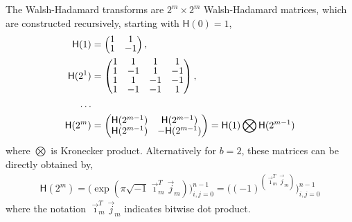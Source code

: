 \documentclass{iitthesis}          %
\newcommand{\mH}{\mathsf{H}}
\begin{document}
The Walsh-Hadamard transforms are $2^m \times 2^m$ Walsh-Hadamard matrices, which are constructed recursively, starting with $\mH(0) = 1$,
\begin{align}
\nonumber
\arraycolsep=1.4pt\def\arraystretch{0.9}
\mH(1) &=
\begin{pmatrix}
1 & 1 \\ 1 & -1
\end{pmatrix}, \\
\nonumber
\mH(2^1) &= 
\begin{pmatrix}
1 & 1 & 1 & 1 \\ 
1 & -1 & 1 & -1 \\
1 & 1 & -1 & -1 \\ 
1 & -1 & -1 & 1 \\
\end{pmatrix}, \\
\nonumber
\hdots
\\
\label{eqn:hadamard_matrix}
\mH(2^m) &= 
\begin{pmatrix}
\mH(2^{m-1}) & \mH(2^{m-1}) \\ \mH(2^{m-1}) & -\mH(2^{m-1})
\end{pmatrix} = \mH(1) \bigotimes \mH(2^{m-1})
\end{align}
where $\bigotimes$ is Kronecker product. Alternatively for $b=2$, these matrices can be  directly obtained by,
\begin{align*}
\mH(2^m) = \bigg(\exp(\pi \sqrt{-1} \vec{\imath}_m^T\vec {j}_m) \bigg)_{i,j=0}^{n-1}  
= \bigg((-1)^{(\vec{\imath}_m^T \vec{j}_m)} \bigg)_{i,j=0}^{n-1}  
\end{align*}
where the notation $\vec{\imath}_m^T \vec{j}_m$ indicates bitwise dot product. 

\end{document}

